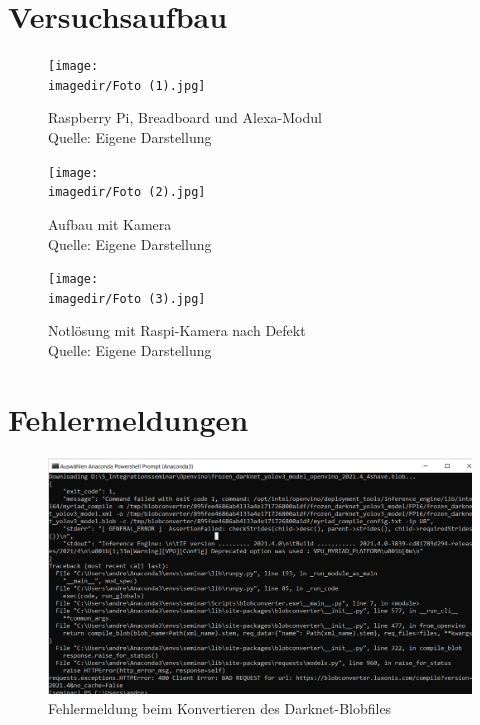 \chapter{Versuchsaufbau}
\begin{figure}[h]
	\centering 
	\texttt{[image: \\imagedir/Foto (1).jpg]}
	\captionsetup{format=hang}
	\caption[Foto Aufbau 1]{\label{}Raspberry Pi, Breadboard und Alexa-Modul\\Quelle: Eigene Darstellung}
\end{figure}
\begin{figure}[H]
	\centering 
	\label{Aufbau2}
	\texttt{[image: \\imagedir/Foto (2).jpg]}
	\captionsetup{format=hang}
	\caption[Foto Aufbau 2]{\label{Aufbauanhang}Aufbau mit Kamera \\Quelle: Eigene Darstellung}
\end{figure}
\begin{figure}
	\centering 
	\label{Aufbau3}
	\texttt{[image: \\imagedir/Foto (3).jpg]}
	\captionsetup{format=hang}
	\caption[Foto Aufbau 3]{\label{}Notlösung mit Raspi-Kamera nach Defekt \\Quelle: Eigene Darstellung}
\end{figure}
\chapter{Fehlermeldungen}
\begin{figure}[h]
	\centering
	\includegraphics[width=0.9\linewidth]{img/Fehler}
	\caption[Fehlermeldung Blobkonvertierung]{Fehlermeldung beim Konvertieren des Darknet-Blobfiles}
	\label{Fehler}
\end{figure}



